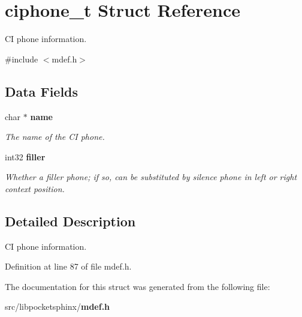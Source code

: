 \section{ciphone\-\_\-t Struct Reference}
\label{structciphone__t}


C\-I phone information.  




{\ttfamily \#include $<$mdef.\-h$>$}

\subsection*{Data Fields}
\begin{DoxyCompactItemize}
\item 
char $\ast$ {\bf name}\label{structciphone__t_a2327c5f09fa245c25926c718fdab642d}

\begin{DoxyCompactList}\small\item\em The name of the C\-I phone. \end{DoxyCompactList}\item 
int32 {\bf filler}\label{structciphone__t_a96e20b175c00c4edcd75d922dba067cd}

\begin{DoxyCompactList}\small\item\em Whether a filler phone; if so, can be substituted by silence phone in left or right context position. \end{DoxyCompactList}\end{DoxyCompactItemize}


\subsection{Detailed Description}
C\-I phone information. 

Definition at line 87 of file mdef.\-h.



The documentation for this struct was generated from the following file\-:\begin{DoxyCompactItemize}
\item 
src/libpocketsphinx/{\bf mdef.\-h}\end{DoxyCompactItemize}
